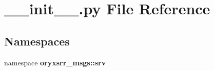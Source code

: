 \section{\-\_\-\-\_\-init\-\_\-\-\_\-.\-py \-File \-Reference}
\label{srv_2____init_____8py}
\subsection*{\-Namespaces}
\begin{DoxyCompactItemize}
\item 
namespace {\bf oryxsrr\-\_\-msgs\-::srv}
\end{DoxyCompactItemize}
